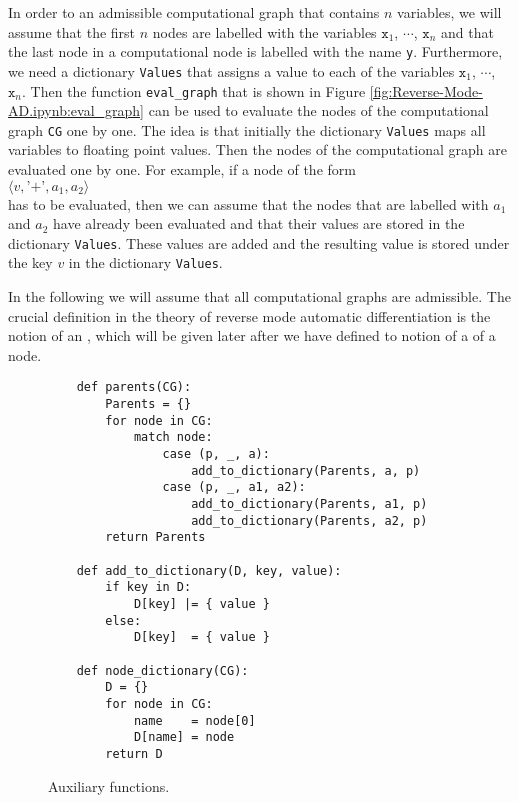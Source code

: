 In order to  an admissible computational graph that contains $n$ variables, we will assume that the first
$n$ nodes are labelled with the variables $\mathtt{x}_1$, $\cdots$, $\mathtt{x}_n$ and that the last node in a computational node
is labelled with the name \texttt{y}.  Furthermore, we need a dictionary \texttt{Values} that assigns a value to each
of the variables $\mathtt{x}_1$, $\cdots$, $\mathtt{x}_n$.  Then the function \texttt{eval\_graph} that is shown in Figure
\ref{fig:Reverse-Mode-AD.ipynb:eval_graph} can be used to evaluate the nodes of the computational graph
\texttt{CG} one by one.  The idea is that initially the dictionary \texttt{Values} maps all variables to
floating point values.  Then the nodes of the computational graph are evaluated one by one.  For example, if a
node of the form
\\[0.2cm]
\hspace*{1.3cm}
$\langle v, \texttt{'+'}, a_1, a_2 \rangle$
\\[0.2cm]
has to be evaluated, then we can assume that the nodes that are labelled with $a_1$ and $a_2$ have already been
evaluated and that their values are stored in the dictionary \texttt{Values}.  These values are added and the
resulting value is stored under the key $v$ in the dictionary \texttt{Values}.

In the following we will assume that all computational graphs are admissible.
The crucial definition in the theory of reverse mode automatic differentiation is the notion of an
, which will be given later after we have defined to notion of a  of a node.  
\FloatBarrier

\begin{figure}[!ht]
\centering
\begin{verbatim}
    def parents(CG):
        Parents = {}
        for node in CG:
            match node:
                case (p, _, a):
                    add_to_dictionary(Parents, a, p)
                case (p, _, a1, a2):
                    add_to_dictionary(Parents, a1, p)
                    add_to_dictionary(Parents, a2, p)
        return Parents                 
    
    def add_to_dictionary(D, key, value):
        if key in D:
            D[key] |= { value }
        else:
            D[key]  = { value }
    
    def node_dictionary(CG):
        D = {}
        for node in CG:
            name    = node[0]
            D[name] = node
        return D
\end{verbatim}
\vspace*{-0.3cm}
\caption{Auxiliary functions.}
\label{fig:Reverse-Mode-AD.ipynb:auxiliary}
\end{figure}


